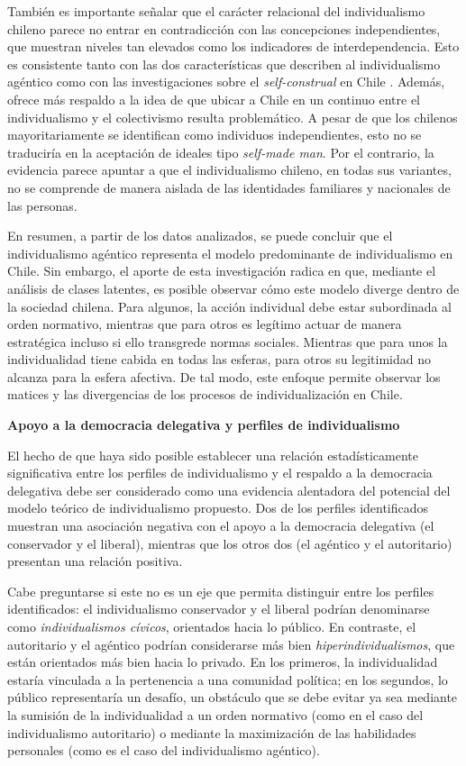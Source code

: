 \documentclass[12pt,twoside]{templates/facsothesis}
\begin{document}
También es importante señalar que el carácter relacional del individualismo chileno parece no entrar en contradicción con las concepciones independientes, que muestran niveles tan elevados como los indicadores de interdependencia. Esto es consistente tanto con las dos características que describen al individualismo agéntico \citep{araujo2020} como con las investigaciones sobre el \emph{self-construal} en Chile \citep{benavides2020, kolstad2009}. Además, ofrece más respaldo a la idea de que ubicar a Chile en un continuo entre el individualismo y el colectivismo resulta problemático. A pesar de que los chilenos mayoritariamente se identifican como individuos independientes, esto no se traduciría en la aceptación de ideales tipo \emph{self-made man}. Por el contrario, la evidencia parece apuntar a que el individualismo chileno, en todas sus variantes, no se comprende de manera aislada de las identidades familiares y nacionales de las personas.

En resumen, a partir de los datos analizados, se puede concluir que el individualismo agéntico representa el modelo predominante de individualismo en Chile. Sin embargo, el aporte de esta investigación radica en que, mediante el análisis de clases latentes, es posible observar cómo este modelo diverge dentro de la sociedad chilena. Para algunos, la acción individual debe estar subordinada al orden normativo, mientras que para otros es legítimo actuar de manera estratégica incluso si ello transgrede normas sociales. Mientras que para unos la individualidad tiene cabida en todas las esferas, para otros su legitimidad no alcanza para la esfera afectiva. De tal modo, este enfoque permite observar los matices y las divergencias de los procesos de individualización en Chile.

\textbf{Apoyo a la democracia delegativa y perfiles de individualismo}

El hecho de que haya sido posible establecer una relación estadísticamente significativa entre los perfiles de individualismo y el respaldo a la democracia delegativa debe ser considerado como una evidencia alentadora del potencial del modelo teórico de individualismo propuesto. Dos de los perfiles identificados muestran una asociación negativa con el apoyo a la democracia delegativa (el conservador y el liberal), mientras que los otros dos (el agéntico y el autoritario) presentan una relación positiva.

Cabe preguntarse si este no es un eje que permita distinguir entre los perfiles identificados: el individualismo conservador y el liberal podrían denominarse como \emph{individualismos cívicos}, orientados hacia lo público. En contraste, el autoritario y el agéntico podrían considerarse más bien \emph{hiperindividualismos}, que están orientados más bien hacia lo privado. En los primeros, la individualidad estaría vinculada a la pertenencia a una comunidad política; en los segundos, lo público representaría un desafío, un obstáculo que se debe evitar ya sea mediante la sumisión de la individualidad a un orden normativo (como en el caso del individualismo autoritario) o mediante la maximización de las habilidades personales (como es el caso del individualismo agéntico).
\end{document}
